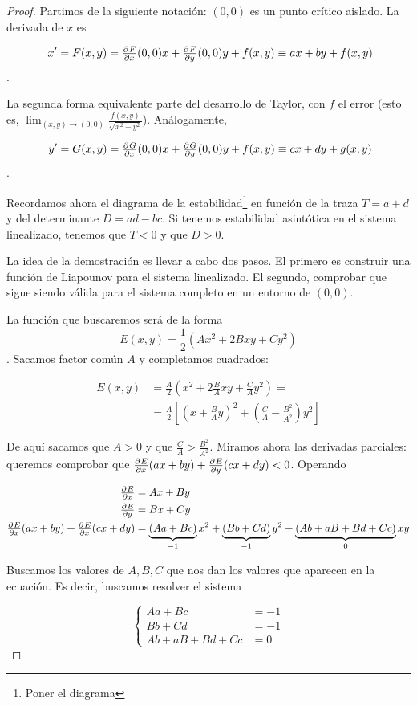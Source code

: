 \begin{proof}
Partimos de la siguiente notación: $(0,0)$ es un punto crítico aislado. La derivada de $x$ es

\[ x' = F(x,y) = \pd{F}{x}(0,0)x + \pd{F}{y}(0,0)y + f(x,y) \equiv ax + by + f(x,y) \]. 

La segunda forma equivalente parte del desarrollo de Taylor, con $f$ el error (esto es, $\lim_{(x,y)\to (0,0)} \frac{f(x,y)}{\sqrt{x^2+y^2}}$). Análogamente,

\[ y' = G(x,y) = \pd{G}{x}(0,0)x + \pd{G}{y}(0,0)y + f(x,y) \equiv cx + dy + g(x,y) \]. 

Recordamos ahora el diagrama de la estabilidad\footnote{Poner el diagrama} en función de la traza $T=a+d$ y del determinante $D=ad-bc$. Si tenemos estabilidad asintótica en el sistema linealizado, tenemos que $T < 0$ y que $D > 0$.

La idea de la demostración es llevar a cabo dos pasos. El primero es construir una función de Liapounov para el sistema linealizado. El segundo, comprobar que sigue siendo válida para el sistema completo en un entorno de $(0,0)$.

La función que buscaremos será de la forma \[ E(x,y) = \frac{1}{2}\left(Ax^2 + 2Bxy + Cy^2\right) \]. Sacamos factor común $A$ y completamos cuadrados:

\begin{align*}
 E(x,y) &= \frac{A}{2}\left(x^2 + 2\frac{B}{A}xy + \frac{C}{A}y^2\right) = \\
 &= \frac{A}{2}\left[\left(x+\frac{B}{A}y\right)^2 + \left(\frac{C}{A} - \frac{B^2}{A^2}\right)y^2\right]
\end{align*}

De aquí sacamos que $A>0$ y que $\frac{C}{A}>\frac{B^2}{A^2}$. Miramos ahora las derivadas parciales: queremos comprobar que $\pd{E}{x}(ax+by) + \pd{E}{y} (cx+dy) < 0$. Operando

\begin{align*}
\pd{E}{x} &= Ax+By \\
\pd{E}{y} &= Bx + Cy \\
\pd{E}{x} (ax+by) + \pd{E}{x}(cx+dy) &= 
	\underbrace{(Aa+Bc)}_{-1}x^2 +
	\underbrace{(Bb+Cd)}_{-1}y^2 +
	\underbrace{(Ab+aB+Bd+Cc)}_{0}xy
\end{align*}

Buscamos los valores de $A,B,C$ que nos dan los valores que aparecen en la ecuación. Es decir, buscamos resolver el sistema

\[ \begin{cases} Aa + Bc &= -1 \\ 
Bb+Cd &= -1 \\
Ab + aB +Bd + Cc &= 0
\end{cases} \]


\end{proof}
